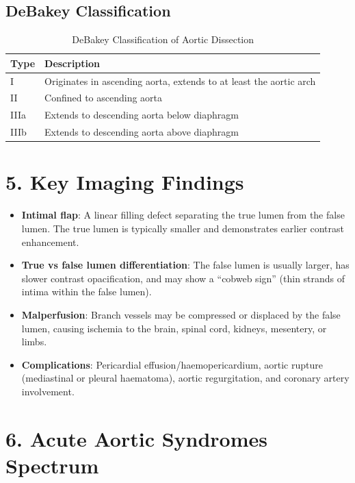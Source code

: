 \subsection{DeBakey Classification}
\begin{table}[h]
\centering
\begin{tabular}{@{}p{}p{}@{}}
\hline
\textbf{Type} & \textbf{Description} \\
\hline
I & Originates in ascending aorta, extends to at least the aortic arch \\
II & Confined to ascending aorta \\
IIIa & Extends to descending aorta below diaphragm \\
IIIb & Extends to descending aorta above diaphragm \\
\hline
\end{tabular}
\caption{DeBakey Classification of Aortic Dissection}
\end{table}

\section{5. Key Imaging Findings}

\begin{itemize}
  \item \textbf{Intimal flap}: A linear filling defect separating the true lumen from the false lumen. The true lumen is typically smaller and demonstrates earlier contrast enhancement.
  \item \textbf{True vs false lumen differentiation}: The false lumen is usually larger, has slower contrast opacification, and may show a ``cobweb sign'' (thin strands of intima within the false lumen).
  \item \textbf{Malperfusion}: Branch vessels may be compressed or displaced by the false lumen, causing ischemia to the brain, spinal cord, kidneys, mesentery, or limbs.
  \item \textbf{Complications}: Pericardial effusion/haemopericardium, aortic rupture (mediastinal or pleural haematoma), aortic regurgitation, and coronary artery involvement.
\end{itemize}

\section{6. Acute Aortic Syndromes Spectrum}

